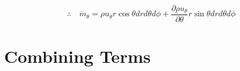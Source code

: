 \documentclass[12pt, letterpaper, twoside]{article}
\begin{document}
            \begin{equation}\label{eq:mdottheta}
                \therefore \quad \dot{m}_{\theta} = 
                \rho u_{\theta} r\cos\theta dr d\theta d\phi + 
                \frac{\partial\rho u_{\theta}}{\partial\theta} r\sin\theta dr d\theta d\phi
            \end{equation}

\section{Combining Terms}\label{sect:combineterms}
\end{document}
